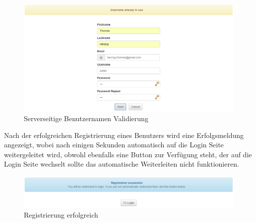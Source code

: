\documentclass[11pt, a4paper, twoside]{article}   	%
\begin{document}
\begin{figure}[h]
	\centering
	\includegraphics[scale=0.4]{images/registration_server_validation_username.PNG}
	\caption
	{Serverseitige Benutzernamen Validierung}
\end{figure}
\newpage
Nach der erfolgreichen Registrierung eines Benutzers wird eine Erfolgsmeldung angezeigt, wobei nach einigen Sekunden automatisch auf die Login Seite weitergeleitet wird, obwohl ebenfalls eine Button zur Verfügung steht, der auf die Login Seite wechselt sollte das automatische Weiterleiten nicht funktionieren.
\begin{figure}[h]
	\centering
	\includegraphics[scale=0.6]{images/registration_success.PNG}
	\caption
	{Registrierung erfolgreich}
\end{figure}\\\\
\newpage
\end{document}
